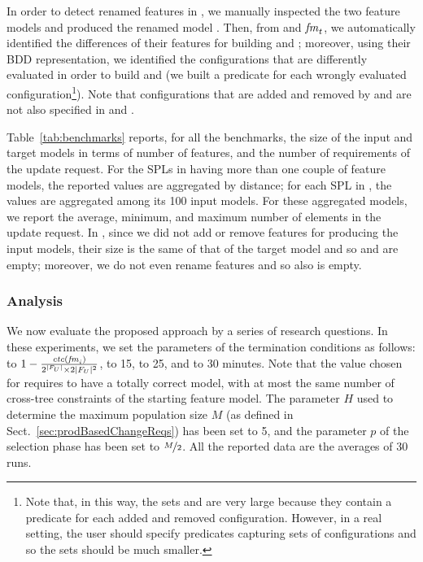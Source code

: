 \begin{tikzborder}{\cite{Gargantini16:validation}}
\begin{tikzborder}{\cite{gargantini_combinatorial_2017}}
\begin{tikzborder}{\cite{gargantini_combinatorial_2017}}
\begin{tikzborder}{\cite{garn2019}}
\begin{tikzborder}{\cite{arcaini2019achieving}}
	In order to detect renamed features in \Ftbr, we manually inspected the two feature models and produced the renamed model \fmrenamed. Then, from \fmrenamed and $\mathit{fm}_t$, we automatically identified the differences of their features for building \Fadd and \Frem; moreover, using their BDD representation, we identified the configurations that are differently evaluated in order to build \CFrelax and \CFrem (we built a predicate for each wrongly evaluated configuration\footnote{Note that, in this way, the sets \CFrelax and \CFrem are very large because they contain a predicate for each added and removed configuration. However, in a real setting, the user should specify predicates capturing sets of configurations and so the sets should be much smaller.}). Note that configurations that are added and removed by \Fadd and \Frem are not also specified in \CFrelax and \CFrem.
	
	Table~\ref{tab:benchmarks} reports, for all the benchmarks, the size of the input and target models in terms of number of features, and the number of requirements of the update request. For the SPLs in \benchReal having more than one couple of feature models, the reported values are aggregated by distance; for each SPL in \benchMut, the values are aggregated among its 100 input models. For these aggregated models, we report the average, minimum, and maximum number of elements in the update request. In \benchMut, since we did not add or remove features for producing the input models, their size is the same of that of the target model and so \Fadd and \Frem are empty; moreover, we do not even rename features and so also \Ftbr is empty.\be
	
	\subsubsection{Analysis}\label{sec:analysis}
	
	\bb We now evaluate the proposed approach by a series of research questions. In these experiments, we set the parameters of the termination conditions as follows: \thF to $1 - \frac{\mathit{ctc}(\mathit{fm}_i)}{{2^{|F_U|} \times 2|F_U|^2}}$, \thNI to 15, \thI to 25, and \thT to 30 minutes. Note that the value chosen for \thF requires to have a totally correct model, with at most the same number of cross-tree constraints of the starting feature model. The parameter $H$ used to determine the maximum population size $M$ (as defined in Sect.~\ref{sec:prodBasedChangeReqs}) has been set to 5, and the parameter $p$ of the selection phase has been set to $\nicefrac{M}{2}$. All the reported data are the averages of 30 runs.
	

\end{tikzborder}
\end{tikzborder}
\end{tikzborder}
\end{tikzborder}
\end{tikzborder}

